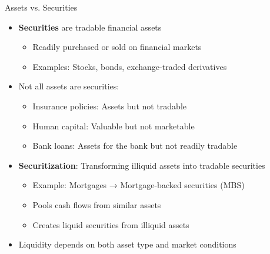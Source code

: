 \documentclass[10pt,handout]{beamer}
\begin{document}
\begin{frame}{Assets vs. Securities}
  \begin{itemize}[<+->]
    \item \textbf{Securities} are tradable financial assets
      \begin{itemize}
        \item Readily purchased or sold on financial markets
        \item Examples: Stocks, bonds, exchange-traded derivatives
      \end{itemize}
    \item Not all assets are securities:
      \begin{itemize}
        \item Insurance policies: Assets but not tradable
        \item Human capital: Valuable but not marketable
        \item Bank loans: Assets for the bank but not readily tradable
      \end{itemize}
    \item \textbf{Securitization}: Transforming illiquid assets into tradable securities
      \begin{itemize}
        \item Example: Mortgages → Mortgage-backed securities (MBS)
        \item Pools cash flows from similar assets
        \item Creates liquid securities from illiquid assets
      \end{itemize}
    \item Liquidity depends on both asset type and market conditions
  \end{itemize}
\end{frame}
\end{document}
